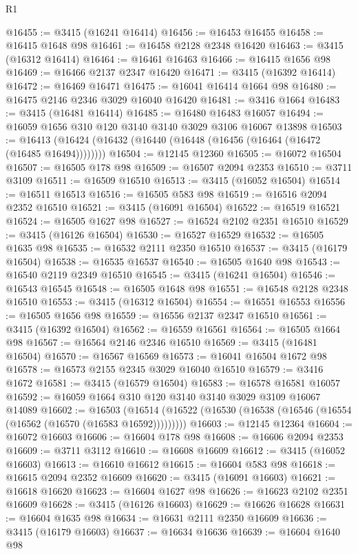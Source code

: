 \begin{lexlean}{R1}
\begin{coremodule}
@16455 := @3415 (@16241 @16414)
@16456 := @16453 @16455
@16458 := @16415 @1648 @98
@16461 := @16458 @2128 @2348 @16420
@16463 := @3415 (@16312 @16414)
@16464 := @16461 @16463
@16466 := @16415 @1656 @98
@16469 := @16466 @2137 @2347 @16420
@16471 := @3415 (@16392 @16414)
@16472 := @16469 @16471
@16475 := @16041 @16414 @1664 @98
@16480 := @16475 @2146 @2346 @3029 @16040 @16420
@16481 := @3416 @1664
@16483 := @3415 (@16481 @16414)
@16485 := @16480 @16483 @16057
@16494 := @16059 @1656 @310 @120 @3140 @3140 @3029 @3106 @16067 @13898
@16503 := @16413 (@16424 (@16432 (@16440 (@16448 (@16456 (@16464 (@16472 (@16485 @16494))))))))
@16504 := @12145 @12360
@16505 := @16072 @16504
@16507 := @16505 @178 @98
@16509 := @16507 @2094 @2353
@16510 := @3711 @3109
@16511 := @16509 @16510
@16513 := @3415 (@16052 @16504)
@16514 := @16511 @16513
@16516 := @16505 @583 @98
@16519 := @16516 @2094 @2352 @16510
@16521 := @3415 (@16091 @16504)
@16522 := @16519 @16521
@16524 := @16505 @1627 @98
@16527 := @16524 @2102 @2351 @16510
@16529 := @3415 (@16126 @16504)
@16530 := @16527 @16529
@16532 := @16505 @1635 @98
@16535 := @16532 @2111 @2350 @16510
@16537 := @3415 (@16179 @16504)
@16538 := @16535 @16537
@16540 := @16505 @1640 @98
@16543 := @16540 @2119 @2349 @16510
@16545 := @3415 (@16241 @16504)
@16546 := @16543 @16545
@16548 := @16505 @1648 @98
@16551 := @16548 @2128 @2348 @16510
@16553 := @3415 (@16312 @16504)
@16554 := @16551 @16553
@16556 := @16505 @1656 @98
@16559 := @16556 @2137 @2347 @16510
@16561 := @3415 (@16392 @16504)
@16562 := @16559 @16561
@16564 := @16505 @1664 @98
@16567 := @16564 @2146 @2346 @16510
@16569 := @3415 (@16481 @16504)
@16570 := @16567 @16569
@16573 := @16041 @16504 @1672 @98
@16578 := @16573 @2155 @2345 @3029 @16040 @16510
@16579 := @3416 @1672
@16581 := @3415 (@16579 @16504)
@16583 := @16578 @16581 @16057
@16592 := @16059 @1664 @310 @120 @3140 @3140 @3029 @3109 @16067 @14089
@16602 := @16503
    (@16514 (@16522 (@16530 (@16538 (@16546 (@16554 (@16562 (@16570 (@16583 @16592)))))))))
@16603 := @12145 @12364
@16604 := @16072 @16603
@16606 := @16604 @178 @98
@16608 := @16606 @2094 @2353
@16609 := @3711 @3112
@16610 := @16608 @16609
@16612 := @3415 (@16052 @16603)
@16613 := @16610 @16612
@16615 := @16604 @583 @98
@16618 := @16615 @2094 @2352 @16609
@16620 := @3415 (@16091 @16603)
@16621 := @16618 @16620
@16623 := @16604 @1627 @98
@16626 := @16623 @2102 @2351 @16609
@16628 := @3415 (@16126 @16603)
@16629 := @16626 @16628
@16631 := @16604 @1635 @98
@16634 := @16631 @2111 @2350 @16609
@16636 := @3415 (@16179 @16603)
@16637 := @16634 @16636
@16639 := @16604 @1640 @98

\end{coremodule}
\end{lexlean}
